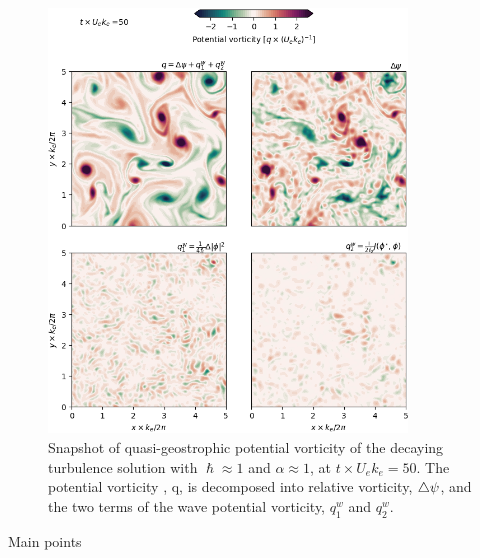 \documentclass[final]{beamer}
\begin{document}
\begin{frame}[t]
\begin{columns}[t]
\begin{column}{0.55\textwidth}
\begin{columns}
\begin{column}{0.475\textwidth}
                        \begin{figure}
                          \includegraphics[width=0.85\textwidth]{figs/pv-terms_turbulence.png}
                          \caption{Snapshot of quasi-geostrophic potential vorticity
                                   of the decaying turbulence solution with $\hslash \approx 1$
                                   and $\alpha \approx 1$, at $t\times U_e k_e = 50$. The potential vorticity
                                   , q, is decomposed into relative vorticity, $\triangle\psi$,
                                   and the two terms of the wave potential vorticity, $q^w_1$ and $q^w_2$.}
                        \end{figure}


                      {
                      \begin{alertblock}{Main points}


\end{alertblock}}
\end{column}
\end{columns}
\end{column}
\end{columns}
\end{frame}
\end{document}
